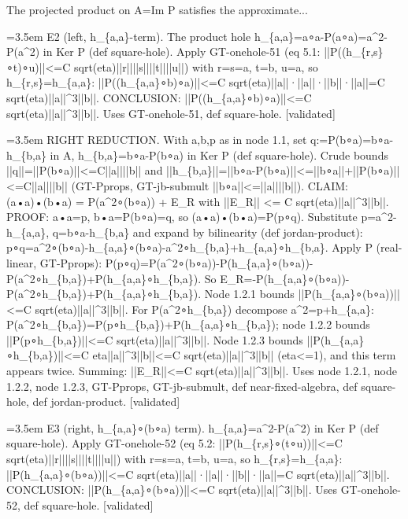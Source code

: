 \documentclass{article}
\newcommand{\step}[1]{\par\noindent\hangindent=3.5em\hangafter=1%
  \makebox[3.5em][l]{\textbf{#1.}}}
\newcommand{\steptag}[1]{\hfill{\small\textsf{[#1]}}}
\begin{document}
\begin{proofbox}{The projected product on A=Im P satisfies the approximate...}
\step{1.1.2} E2 (left, h\_\{a,a\}-term). The product hole h\_\{a,a\}=a∘a-P(a∘a)=a\textasciicircum{}2-P(a\textasciicircum{}2) in Ker P (def square-hole). Apply GT-onehole-51 (eq 5.1: ||P((h\_\{r,s\}∘t)∘u)||<=C sqrt(eta)||r||||s||||t||||u||) with r=s=a, t=b, u=a, so h\_\{r,s\}=h\_\{a,a\}: ||P((h\_\{a,a\}∘b)∘a)||<=C sqrt(eta)||a||·||a||·||b||·||a||=C sqrt(eta)||a||\textasciicircum{}3||b||. CONCLUSION: ||P((h\_\{a,a\}∘b)∘a)||<=C sqrt(eta)||a||\textasciicircum{}3||b||. Uses GT-onehole-51, def square-hole. \steptag{validated} \\[4pt]
\step{1.2} RIGHT REDUCTION. With a,b,p as in node 1.1, set q:=P(b∘a)=b∘a-h\_\{b,a\} in A, h\_\{b,a\}=b∘a-P(b∘a) in Ker P (def square-hole). Crude bounds ||q||=||P(b∘a)||<=C||a||||b|| and ||h\_\{b,a\}||=||b∘a-P(b∘a)||<=||b∘a||+||P(b∘a)||<=C||a||||b|| (GT-Pprops, GT-jb-submult ||b∘a||<=||a||||b||). CLAIM: (a•a)•(b•a) = P(a\textasciicircum{}2∘(b∘a)) + E\_R with ||E\_R|| <= C sqrt(eta)||a||\textasciicircum{}3||b||. PROOF: a•a=p, b•a=P(b∘a)=q, so (a•a)•(b•a)=P(p∘q). Substitute p=a\textasciicircum{}2-h\_\{a,a\}, q=b∘a-h\_\{b,a\} and expand by bilinearity (def jordan-product): p∘q=a\textasciicircum{}2∘(b∘a)-h\_\{a,a\}∘(b∘a)-a\textasciicircum{}2∘h\_\{b,a\}+h\_\{a,a\}∘h\_\{b,a\}. Apply P (real-linear, GT-Pprops): P(p∘q)=P(a\textasciicircum{}2∘(b∘a))-P(h\_\{a,a\}∘(b∘a))-P(a\textasciicircum{}2∘h\_\{b,a\})+P(h\_\{a,a\}∘h\_\{b,a\}). So E\_R=-P(h\_\{a,a\}∘(b∘a))-P(a\textasciicircum{}2∘h\_\{b,a\})+P(h\_\{a,a\}∘h\_\{b,a\}). Node 1.2.1 bounds ||P(h\_\{a,a\}∘(b∘a))||<=C sqrt(eta)||a||\textasciicircum{}3||b||. For P(a\textasciicircum{}2∘h\_\{b,a\}) decompose a\textasciicircum{}2=p+h\_\{a,a\}: P(a\textasciicircum{}2∘h\_\{b,a\})=P(p∘h\_\{b,a\})+P(h\_\{a,a\}∘h\_\{b,a\}); node 1.2.2 bounds ||P(p∘h\_\{b,a\})||<=C sqrt(eta)||a||\textasciicircum{}3||b||. Node 1.2.3 bounds ||P(h\_\{a,a\}∘h\_\{b,a\})||<=C eta||a||\textasciicircum{}3||b||<=C sqrt(eta)||a||\textasciicircum{}3||b|| (eta<=1), and this term appears twice. Summing: ||E\_R||<=C sqrt(eta)||a||\textasciicircum{}3||b||. Uses node 1.2.1, node 1.2.2, node 1.2.3, GT-Pprops, GT-jb-submult, def near-fixed-algebra, def square-hole, def jordan-product. \steptag{validated} \\[6pt]
\step{1.2.1} E3 (right, h\_\{a,a\}∘(b∘a) term). h\_\{a,a\}=a\textasciicircum{}2-P(a\textasciicircum{}2) in Ker P (def square-hole). Apply GT-onehole-52 (eq 5.2: ||P(h\_\{r,s\}∘(t∘u))||<=C sqrt(eta)||r||||s||||t||||u||) with r=s=a, t=b, u=a, so h\_\{r,s\}=h\_\{a,a\}: ||P(h\_\{a,a\}∘(b∘a))||<=C sqrt(eta)||a||·||a||·||b||·||a||=C sqrt(eta)||a||\textasciicircum{}3||b||. CONCLUSION: ||P(h\_\{a,a\}∘(b∘a))||<=C sqrt(eta)||a||\textasciicircum{}3||b||. Uses GT-onehole-52, def square-hole. \steptag{validated} \\[4pt]

\end{proofbox}
\end{document}
